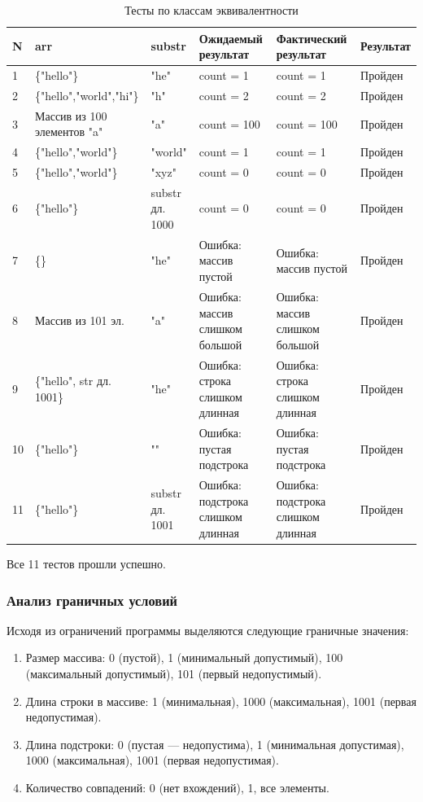 \documentclass{article}[14pt]
\begin{document}
{\centering\large{
\begin{longtable}{|p{0.4cm}|p{4cm}|p{2.5cm}|p{3cm}|p{3cm}|p{2cm}|}
	\caption{Тесты по классам эквивалентности}\\
	\hline
	N & arr & substr & Ожидаемый результат & Фактический результат & Результат \\ \hline
	1 & \{"hello"\} & "he" & count = 1 & count = 1 & Пройден \\ \hline
	2 & \{"hello","world","hi"\} & "h" & count = 2 & count = 2 & Пройден \\ \hline
	3 & Массив из 100 элементов "a" & "a" & count = 100 & count = 100 & Пройден \\ \hline
	4 & \{"hello","world"\} & "world" & count = 1 & count = 1 & Пройден \\ \hline
	5 & \{"hello","world"\} & "xyz" & count = 0 & count = 0 & Пройден \\ \hline
	6 & \{"hello"\} & substr дл. 1000 & count = 0 & count = 0 & Пройден \\ \hline
	7 & \{\} & "he" & Ошибка: массив пустой & Ошибка: массив пустой & Пройден \\ \hline
	8 & Массив из 101 эл. & "a" & Ошибка: массив слишком большой & Ошибка: массив слишком большой & Пройден \\ \hline
	9 & \{"hello", str дл. 1001\} & "he" & Ошибка: строка слишком длинная & Ошибка: строка слишком длинная & Пройден \\ \hline
	10 & \{"hello"\} & "" & Ошибка: пустая подстрока & Ошибка: пустая подстрока & Пройден \\ \hline
	11 & \{"hello"\} & substr дл. 1001 & Ошибка: подстрока слишком длинная & Ошибка: подстрока слишком длинная & Пройден \\ \hline
\end{longtable}}}

Все 11 тестов прошли успешно.

\subsubsection{Анализ граничных условий}

Исходя из ограничений программы выделяются следующие граничные значения:

\begin{enumerate}
	\item Размер массива: 0 (пустой), 1 (минимальный допустимый), 100 (максимальный допустимый), 101 (первый недопустимый).
	\item Длина строки в массиве: 1 (минимальная), 1000 (максимальная), 1001 (первая недопустимая).
	\item Длина подстроки: 0 (пустая --- недопустима), 1 (минимальная допустимая), 1000 (максимальная), 1001 (первая недопустимая).
	\item Количество совпадений: 0 (нет вхождений), 1, все элементы.
\end{enumerate}
\end{document}
